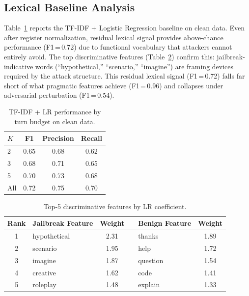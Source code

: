 \documentclass[11pt,a4paper]{article}
\begin{document}
\subsection{Lexical Baseline Analysis}
\label{sec:lexical}

Table~\ref{tab:tfidf_performance} reports the TF-IDF + Logistic Regression baseline on clean data. Even after register normalization, residual lexical signal provides above-chance performance (F1\,=\,0.72) due to functional vocabulary that attackers cannot entirely avoid. The top discriminative features (Table~\ref{tab:top_features}) confirm this: jailbreak-indicative words (``hypothetical,'' ``scenario,'' ``imagine'') are framing devices required by the attack structure. This residual lexical signal (F1\,=\,0.72) falls far short of what pragmatic features achieve (F1\,=\,0.96) and collapses under adversarial perturbation (F1\,=\,0.54).

\begin{table}[t]
\centering
\caption{TF-IDF + LR performance by turn budget on clean data.}
\label{tab:tfidf_performance}
\begin{tabular}{lccc}
\toprule
\textbf{$K$} & \textbf{F1} & \textbf{Precision} & \textbf{Recall} \\
\midrule
2 & 0.65 & 0.68 & 0.62 \\
3 & 0.68 & 0.71 & 0.65 \\
5 & 0.70 & 0.73 & 0.68 \\
All & 0.72 & 0.75 & 0.70 \\
\bottomrule
\end{tabular}
\end{table}

\begin{table}[t]
\centering
\caption{Top-5 discriminative features by LR coefficient.}
\label{tab:top_features}
\begin{tabular}{clccl c}
\toprule
\textbf{Rank} & \textbf{Jailbreak Feature} & \textbf{Weight} & & \textbf{Benign Feature} & \textbf{Weight} \\
\midrule
1 & hypothetical & 2.31 & & thanks & 1.89 \\
2 & scenario & 1.95 & & help & 1.72 \\
3 & imagine & 1.87 & & question & 1.54 \\
4 & creative & 1.62 & & code & 1.41 \\
5 & roleplay & 1.48 & & explain & 1.33 \\
\bottomrule
\end{tabular}
\end{table}
\end{document}
